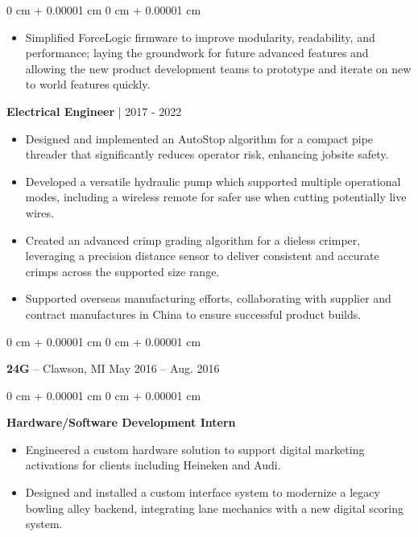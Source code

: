 \documentclass[10pt, letterpaper]{article}
\newenvironment{highlights}{
    \begin{itemize}[
        topsep=0.10 cm,
        parsep=0.10 cm,
        partopsep=0pt,
        itemsep=0pt,
        leftmargin=0 cm + 10pt
    ]
}{
    \end{itemize}
} %
\newenvironment{onecolentry}{
    \begin{adjustwidth}{
        0 cm + 0.00001 cm
    }{
        0 cm + 0.00001 cm
    }
}{
    \end{adjustwidth}
} %
\newenvironment{twocolentry}[2][]{
    \onecolentry
    \def\secondColumn{#2}
    \setcolumnwidth{\fill, 4.5 cm}
    \begin{paracol}{2}
}{
    \switchcolumn \raggedleft \secondColumn
    \end{paracol}
    \endonecolentry
} %
\begin{document}
\begin{onecolentry}
\begin{highlights}
                \item Simplified ForceLogic firmware to improve modularity, readability, and performance; laying the groundwork for future advanced features and allowing the new product development teams to prototype and iterate on new to world features quickly.
            \end{highlights}
        \textbf{Electrical Engineer} | 2017 - 2022
            \begin{highlights}
                \item Designed and implemented an AutoStop algorithm for a compact pipe threader that significantly reduces operator risk, enhancing jobsite safety.
                \item Developed a versatile hydraulic pump which supported multiple operational modes, including a wireless remote for safer use when cutting potentially live wires.
                \item Created an advanced crimp grading algorithm for a dieless crimper, leveraging a precision distance sensor to deliver consistent and accurate crimps across the supported size range.
                \item Supported overseas manufacturing efforts, collaborating with supplier and contract manufactures in China to ensure successful product builds.
            \end{highlights}
        \end{onecolentry}

        \vspace{0.3 cm}

        \begin{twocolentry}{
            May 2016 – Aug. 2016
        }
            \textbf{24G} -- Clawson, MI\end{twocolentry}

        \vspace{0.10 cm}
        \begin{onecolentry}
        \textbf{Hardware/Software Development Intern}
            \begin{highlights}
                \item Engineered a custom hardware solution to support digital marketing activations for clients including Heineken and Audi. 
                \item Designed and installed a custom interface system to modernize a legacy bowling alley backend, integrating lane mechanics with a new digital scoring system.
            \end{highlights}
        \end{onecolentry}
\end{document}
